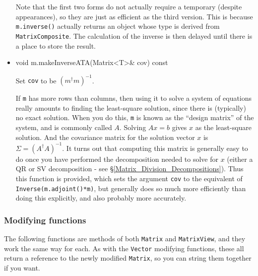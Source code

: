 \documentclass[twoside,letterpaper,11pt]{article}
\renewcommand{\tt}[1]{{\lstinline {#1}}}
\begin{document}
\begin{itemize}
Note that the first two forms do not actually require a 
temporary (despite appearances), so they are just as efficient as the third version.
This is because \tt{m.inverse()} actually returns an object whose type is derived from
\tt{MatrixComposite}.  The calculation of the inverse is then delayed 
until there is a place to store the result.

\item
\begin{tmvcode}
void m.makeInverseATA(Matrix<T>& cov) const
\end{tmvcode}
Set \tt{cov} to be $(m^\dagger m)^{-1}$.

If \tt{m} has more rows than columns, then using it to solve a system of equations
really amounts to finding the least-square solution, since there is (typically) no
exact solution.  When you do this, \tt{m} is known as the ``design matrix'' of the system,
and is commonly called $A$.  Solving $A x=b$ gives $x$ as the least-square 
solution.  And the covariance matrix for the solution vector $x$ is 
$\Sigma = (A^\dagger A)^{-1}$.
It turns out that computing this matrix is generally easy to do once you have 
performed the decomposition needed to solve for $x$ (either a QR or SV 
decomposition - see \S\ref{Matrix_Division_Decompositions}).  
Thus this function is provided, which sets the
argument \tt{cov} to the equivalent of \tt{Inverse(m.adjoint()*m)}, 
but generally does so much more efficiently than doing this explicitly, 
and also probably more accurately.

\end{itemize}

\subsubsection{Modifying functions}

The following functions are methods of both \tt{Matrix} and \tt{MatrixView},
and they work the same way for each.
As with the \tt{Vector} modifying functions, these all return a reference
to the newly modified \tt{Matrix}, so you can string them together if you want.
\end{document}
